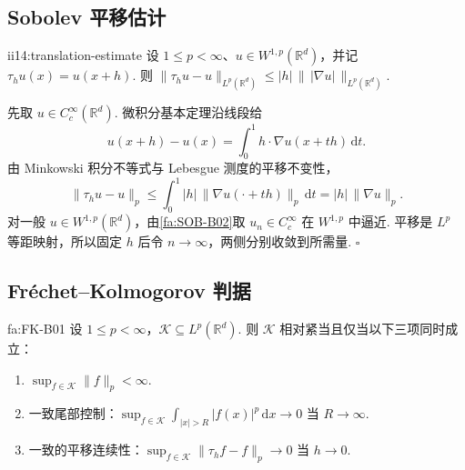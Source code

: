 \subsection{Sobolev 平移估计}

\begin{FALemma}{ii14:translation-estimate}
设 \(\displaystyle1\leqslant p<\infty\)、\(\displaystyle u\in W^{1,p}(\mathbb R^d)\)，并记 \(\displaystyle\tau_hu(x)=u(x+h)\). 则 \(\displaystyle \|\tau_hu-u\|_{L^p(\mathbb R^d)} \leqslant |h|\,\|\,|\nabla u|\,\|_{L^p(\mathbb R^d)}.\)
\end{FALemma}

\begin{FAProof}
先取 \(\displaystyle u\in C_c^\infty(\mathbb R^d)\). 微积分基本定理沿线段给
\[
u(x+h)-u(x)=\int_0^1 h\mathbin{\cdot}\nabla u(x+th)\,\mathrm{d}t.
\]
由 Minkowski 积分不等式与 Lebesgue 测度的平移不变性，
\[
\|\tau_hu-u\|_p
\leqslant
\int_0^1|h|\,\|\nabla u(\cdot+th)\|_p\,\mathrm{d}t
=
|h|\,\|\nabla u\|_p.
\]
对一般 \(\displaystyle u\in W^{1,p}(\mathbb R^d)\)，由\autoref{fa:SOB-B02}取 \(\displaystyle u_n\in C_c^\infty\) 在 \(\displaystyle W^{1,p}\) 中逼近. 平移是 \(\displaystyle L^p\) 等距映射，所以固定 \(\displaystyle h\) 后令 \(\displaystyle n\to\infty\)，两侧分别收敛到所需量.
\hfill\(\square\)
\end{FAProof}

\subsection{Fréchet--Kolmogorov 判据}

\begin{FATheorem}{fa:FK-B01}
设 \(\displaystyle1\leqslant p<\infty\)，\(\displaystyle\mathcal K\subseteq L^p(\mathbb R^d)\). 则 \(\displaystyle\mathcal K\) 相对紧当且仅当以下三项同时成立：
\begin{enumerate}[label=\textup{(\roman*)}]
\item \(\displaystyle\sup_{f\in\mathcal K}\|f\|_p<\infty\).
\item 一致尾部控制：\(\displaystyle\sup_{f\in\mathcal K}\int_{|x|>R}|f(x)|^p\,\mathrm{d}x\to0\) 当 \(\displaystyle R\to\infty\).
\item 一致的平移连续性：\(\displaystyle\sup_{f\in\mathcal K}\|\tau_hf-f\|_p\to0\) 当 \(\displaystyle h\to0\).
\end{enumerate}
\end{FATheorem}


